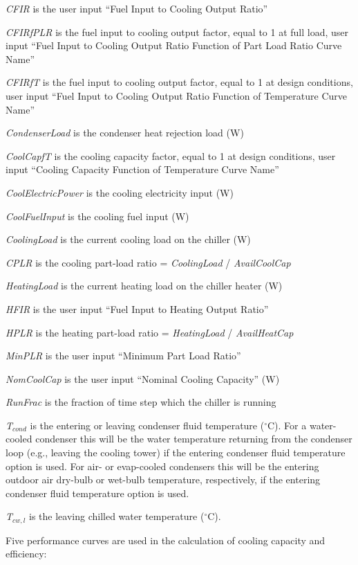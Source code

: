 \emph{CFIR} is the user input ``Fuel Input to Cooling Output Ratio''

\emph{CFIRfPLR} is the fuel input to cooling output factor, equal to 1 at full load, user input ``Fuel Input to Cooling Output Ratio Function of Part Load Ratio Curve Name''

\emph{CFIRfT} is the fuel input to cooling output factor, equal to 1 at design conditions, user input ``Fuel Input to Cooling Output Ratio Function of Temperature Curve Name''

\emph{CondenserLoad} is the condenser heat rejection load (W)

\emph{CoolCapfT} is the cooling capacity factor, equal to 1 at design conditions, user input ``Cooling Capacity Function of Temperature Curve Name''

\emph{CoolElectricPower} is the cooling electricity input (W)

\emph{CoolFuelInput} is the cooling fuel input (W)

\emph{CoolingLoad} is the current cooling load on the chiller (W)

\emph{CPLR} is the cooling part-load ratio = \emph{CoolingLoad} / \emph{AvailCoolCap}

\emph{HeatingLoad} is the current heating load on the chiller heater (W)

\emph{HFIR} is the user input ``Fuel Input to Heating Output Ratio''

\emph{HPLR} is the heating part-load ratio = \emph{HeatingLoad} / \emph{AvailHeatCap}

\emph{MinPLR} is the user input ``Minimum Part Load Ratio''

\emph{NomCoolCap} is the user input ``Nominal Cooling Capacity'' (W)

\emph{RunFrac} is the fraction of time step which the chiller is running

\emph{T\(_{cond}\)} is the entering or leaving condenser fluid temperature (\(^{\circ}\)C). For a water-cooled condenser this will be the water temperature returning from the condenser loop (e.g., leaving the cooling tower) if the entering condenser fluid temperature option is used. For air- or evap-cooled condensers this will be the entering outdoor air dry-bulb or wet-bulb temperature, respectively, if the entering condenser fluid temperature option is used.

\emph{T\(_{cw,l}\)} is the leaving chilled water temperature (\(^{\circ}\)C).

Five performance curves are used in the calculation of cooling capacity and efficiency:

